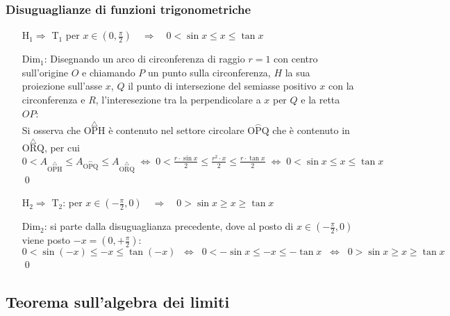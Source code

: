 \documentclass[a4paper]{article}
\begin{document}
\subsubsection*{Disuguaglianze di funzioni trigonometriche}
\begin{itemize}
	\item[H\(_1 \Rightarrow\) T\(_1\)] per \(x \in \left( 0, \displaystyle \frac{\pi}{2} \right) \quad \Rightarrow \quad 0 < \sin x \leq x \leq \tan x\)
	\item[Dim\(_1\):] Disegnando un arco di circonferenza di raggio \(r = 1\) con centro sull'origine \(O\) e chiamando \(P\) un punto sulla circonferenza, \(H\) la sua proiezione sull'asse \(x\),
	\(Q\) il punto di intersezione del semiasse positivo \(x\) con la circonferenza e \(R\), l'interesezione tra la perpendicolare a \(x\) per \(Q\) e la retta \(OP\): \\
	Si osserva che \(\overset{\triangle}{\text{OPH}}\) è contenuto nel settore circolare \(\overset{\smallfrown}{\text{OPQ}}\) che è contenuto in \(\overset{\triangle}{\text{ORQ}}\), per cui \\
	\(\displaystyle 0 < A_{\overset{\triangle}{\text{OPH}}} \leq A_{\overset{\smallfrown}{\text{OPQ}}} \leq A_{\overset{\triangle}{\text{ORQ}}} \; \Leftrightarrow \;
	0 < \frac{r \cdot \sin x}{2} \leq \frac{r ^ 2 \cdot x }{2} \leq \frac{r \cdot \tan x}{2} \; \Leftrightarrow \; 0 < \sin x \leq x \leq \tan x \) \qed
	
	\item[H\(_2 \Rightarrow\) T\(_2\):] per \(x \in \left( \displaystyle - \frac{\pi}{2}, 0 \right) \quad \Rightarrow \quad 0 > \sin x \geq x \geq \tan x\)
	\item[Dim\(_2\):] si parte dalla disuguaglianza precedente, dove al posto di \(x \in \left( \displaystyle - \frac{\pi}{2}, 0 \right)\) viene posto \(-x = \left( 0, \displaystyle + \frac{\pi}{2} \right)\): \\
	\(0 < \sin \left( -x \right) \leq -x \leq \tan \left( -x \right) \;\; \Leftrightarrow \;\; 0 < -\sin x \leq -x \leq -\tan x \;\; \Leftrightarrow \;\; 0 > \sin x \geq x \geq \tan x\) \qed
\end{itemize}

\newpage


\subsection{Teorema sull'algebra dei limiti}
\end{document}
